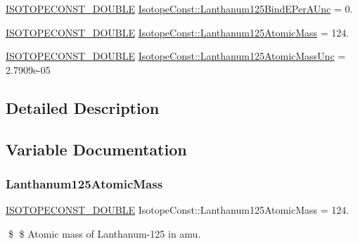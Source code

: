 \begin{DoxyCompactItemize}
\mbox{\hyperlink{group___isotope_const-_macros_ga8f45a7272ce02c0b4c65c44636ed719a}{I\+S\+O\+T\+O\+P\+E\+C\+O\+N\+S\+T\+\_\+\+D\+O\+U\+B\+LE}} \mbox{\hyperlink{group___isotope_const-_lanthanum-_la125_ga7e39885b75e8a5f55f5e52173b19de16}{Isotope\+Const\+::\+Lanthanum125\+Bind\+E\+Per\+A\+Unc}} = 0.
\item 
\mbox{\hyperlink{group___isotope_const-_macros_ga8f45a7272ce02c0b4c65c44636ed719a}{I\+S\+O\+T\+O\+P\+E\+C\+O\+N\+S\+T\+\_\+\+D\+O\+U\+B\+LE}} \mbox{\hyperlink{group___isotope_const-_lanthanum-_la125_gad8542feb0dc13b517c5d6365232ae57e}{Isotope\+Const\+::\+Lanthanum125\+Atomic\+Mass}} = 124.
\item 
\mbox{\hyperlink{group___isotope_const-_macros_ga8f45a7272ce02c0b4c65c44636ed719a}{I\+S\+O\+T\+O\+P\+E\+C\+O\+N\+S\+T\+\_\+\+D\+O\+U\+B\+LE}} \mbox{\hyperlink{group___isotope_const-_lanthanum-_la125_ga7e432e2b046e73644edb189ea5bae5db}{Isotope\+Const\+::\+Lanthanum125\+Atomic\+Mass\+Unc}} = 2.\+7909e-\/05
\end{DoxyCompactItemize}


\subsection{Detailed Description}


\subsection{Variable Documentation}
\mbox{\label{group___isotope_const-_lanthanum-_la125_gad8542feb0dc13b517c5d6365232ae57e}} 
\subsubsection{\texorpdfstring{Lanthanum125\+Atomic\+Mass}{Lanthanum125AtomicMass}}
{\footnotesize\ttfamily \mbox{\hyperlink{group___isotope_const-_macros_ga8f45a7272ce02c0b4c65c44636ed719a}{I\+S\+O\+T\+O\+P\+E\+C\+O\+N\+S\+T\+\_\+\+D\+O\+U\+B\+LE}} Isotope\+Const\+::\+Lanthanum125\+Atomic\+Mass = 124.}

\$ \$ Atomic mass of Lanthanum-\/125 in amu. \mbox{\label{group___isotope_const-_lanthanum-_la125_ga7e432e2b046e73644edb189ea5bae5db}} 
